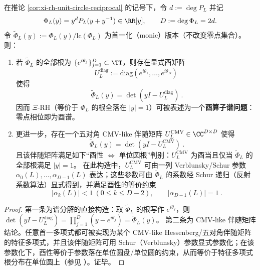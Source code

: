 \begin{proposition}\label{prop:xi-hilbert-polya-cmv}
在推论 \ref{cor:xi-rh-unit-circle-reciprocal} 的记号下，令 \(d:=\deg P_L\) 并记
\[
\Phi_L(y)=y^dP_L(y+y^{-1})\in\RR[y],
\qquad
D:=\deg \Phi_L=2d.
\]
令 \(\widetilde\Phi_L(y):=\Phi_L(y)/\mathrm{lc}(\Phi_L)\) 为首一化（monic）版本（不改变零点集合）。
则：
\begin{enumerate}
  \item 若 \(\widetilde\Phi_L\) 的全部根为 \(\{e^{i\theta_j}\}_{j=1}^{D}\subset\TT\)，则存在显式酉矩阵
  \[
  U_L^{\mathrm{diag}}:=\mathrm{diag}(e^{i\theta_1},\dots,e^{i\theta_D})
  \]
  使得
  \[
  \boxed{\ \widetilde\Phi_L(y)=\det(yI-U_L^{\mathrm{diag}})\ }.
  \]
  因而 \(\Xi\)-RH（等价于 \(\Phi_L\) 的根全落在 \(|y|=1\)）可被表述为一个\textbf{酉算子谱问题}：零点相位即为酉谱。
  \item 更进一步，存在一个五对角 CMV-like 伴随矩阵 \(U_L^{\mathrm{CMV}}\in\CC^{D\times D}\) 使得
  \[
  \boxed{\ \widetilde\Phi_L(y)=\det(yI-U_L^{\mathrm{CMV}})\ }.
  \]
  且该伴随矩阵满足如下“酉性 \(\Leftrightarrow\) 单位圆根”判别：\(U_L^{\mathrm{CMV}}\) 为酉当且仅当 \(\widetilde\Phi_L\) 的全部根满足 \(|y|=1\)。
  在此构造中，\(U_L^{\mathrm{CMV}}\) 可由一列 Verblunsky/Schur 参数 \(\alpha_0(L),\dots,\alpha_{D-1}(L)\) 表达；这些参数可由 \(\widetilde\Phi_L\) 的系数经 Schur 递归（反射系数算法）显式得到，并满足酉性的等价约束
  \[
  \boxed{\ |\alpha_k(L)|<1\ (0\le k\le D-2),\qquad |\alpha_{D-1}(L)|=1\ }.
  \]
\end{enumerate}
\end{proposition}
\begin{proof}
第一条为谱分解的直接构造：取 \(\widetilde\Phi_L\) 的根写作 \(e^{i\theta_j}\)，则 \(\det(yI-U_L^{\mathrm{diag}})=\prod_{j=1}^{D}(y-e^{i\theta_j})=\widetilde\Phi_L(y)\)。
第二条为 CMV-like 伴随矩阵结论。任意首一多项式都可被实现为某个 CMV-like Hessenberg/五对角伴随矩阵的特征多项式，并且该伴随矩阵可用 Schur（Verblunsky）参数显式参数化；在该参数化下，酉性等价于参数落在单位圆盘/单位圆的约束，从而等价于特征多项式根分布在单位圆上（参见 \cite{CanteroMoralVelazquez2003CMV,Simon2005OPUC1,BevilacquaDelCorsoGemignani2015CMVCompanion}）。证毕。
\end{proof}

